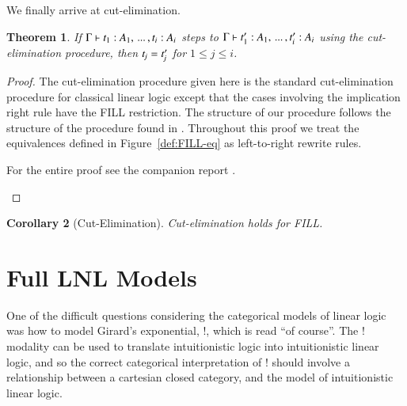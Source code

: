 \documentclass[preprint,6pt]{elsarticle}
\newtheorem{theorem}{Theorem}
\newtheorem{corollary}[theorem]{Corollary}
\begin{document}
We finally arrive at cut-elimination.
\begin{theorem}
  \label{thm:cut-pro}
  If $ \Gamma  \vdash  \mathit{t_{{\mathrm{1}}}}  :  \mathit{A_{{\mathrm{1}}}}  , \, ... \, ,  \mathit{t_{\mathit{i}}}  :  \mathit{A_{\mathit{i}}} $ steps to $ \Gamma  \vdash  \mathit{t'_{{\mathrm{1}}}}  :  \mathit{A_{{\mathrm{1}}}}  , \, ... \, ,  \mathit{t'_{\mathit{i}}}  :  \mathit{A_{\mathit{i}}} $ using the cut-elimination procedure, then $\mathit{t_{\mathit{j}}}  =  \mathit{t'_{\mathit{j}}}$
  for $1 \leq j \leq i$.
\end{theorem}
\begin{proof}
  The cut-elimination procedure given here is the standard
  cut-elimination
  procedure for classical linear logic except that the
  cases involving the implication right rule have the FILL
  restriction. The structure of our procedure follows the structure of
  the procedure found in \cite{Mellies:2009}. Throughout this proof we
  treat the equivalences defined in Figure~\ref{def:FILL-eq} as
  left-to-right rewrite rules. \begin{paper} For the entire proof see
    the companion report \cite{Eades:2016}.\end{paper}
  
\end{proof}

\begin{corollary}[Cut-Elimination]
  \label{corollary:cut-elimination}
  Cut-elimination holds for FILL.
\end{corollary}

\section{Full LNL Models}
\label{sec:full_lnl_models}
One of the difficult questions considering the categorical models of
linear logic was how to model Girard's exponential, $!$, which is read
``of course''.  The $!$ modality can be used to translate
intuitionistic logic into intuitionistic linear logic, and so the
correct categorical interpretation of $!$ should involve a
relationship between a cartesian closed category, and the model of
intuitionistic linear logic.
\end{document}

